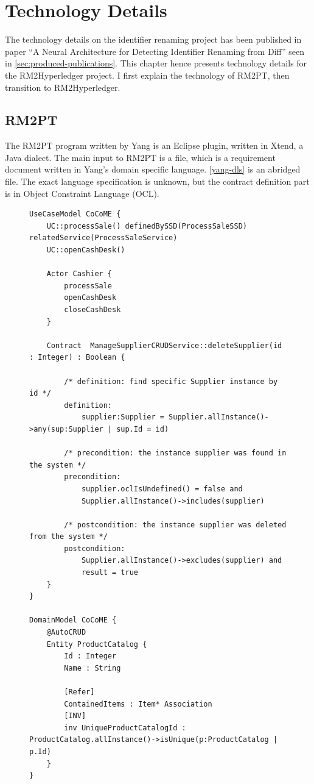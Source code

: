 \chapter{Technology Details}

The technology details on the identifier renaming project has been published in paper ``A Neural Architecture for Detecting Identifier Renaming from Diff'' seen in \autoref{sec:produced-publications}.
This chapter hence presents technology details for the RM2Hyperledger project. I first explain the technology of RM2PT, then transition to RM2Hyperledger.

\section{RM2PT}

The RM2PT program written by Yang is an Eclipse plugin, written in Xtend, a Java dialect. The main input to RM2PT is a  file, which is a requirement document written in Yang's  domain specific language. \autoref{yang-dls} is an abridged  file. The exact language specification is unknown, but the contract definition part is in Object Constraint Language (OCL).

\begin{figure}[ht]
\begin{lstlisting}[language={}, breaklines=true, showstringspaces=false, frame=tb, caption={an abridged \code{.remodel} file. The contract definition part is written in OCL.}, label=yang-dls]
UseCaseModel CoCoME {
	UC::processSale() definedBySSD(ProcessSaleSSD) relatedService(ProcessSaleService)
	UC::openCashDesk()

	Actor Cashier {
		processSale
		openCashDesk
		closeCashDesk
	}

	Contract  ManageSupplierCRUDService::deleteSupplier(id : Integer) : Boolean {

		/* definition: find specific Supplier instance by id */
		definition:
			supplier:Supplier = Supplier.allInstance()->any(sup:Supplier | sup.Id = id)

		/* precondition: the instance supplier was found in the system */
		precondition:
			supplier.oclIsUndefined() = false and
			Supplier.allInstance()->includes(supplier)

		/* postcondition: the instance supplier was deleted from the system */
		postcondition:
			Supplier.allInstance()->excludes(supplier) and
			result = true
	}
}

DomainModel CoCoME {
	@AutoCRUD
	Entity ProductCatalog {
		Id : Integer
		Name : String

		[Refer]
		ContainedItems : Item* Association
		[INV]
		inv UniqueProductCatalogId : ProductCatalog.allInstance()->isUnique(p:ProductCatalog | p.Id)
	}
}
\end{lstlisting}
\end{figure}

